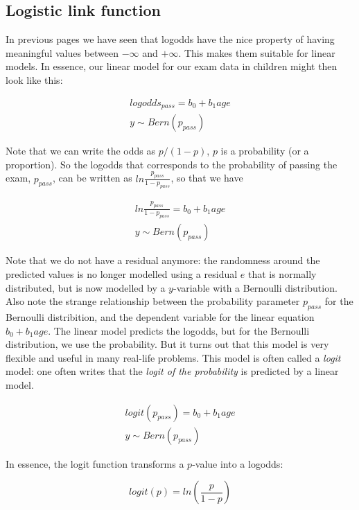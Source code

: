 \documentclass[]{book}\usepackage[]{graphicx}\usepackage[]{color}
\begin{document}
\subsection{Logistic link function}

In previous pages we have seen that logodds have the nice property of having meaningful values between $-\infty$ and $+\infty$. This makes them suitable for linear models. In essence, our linear model for our exam data in children might then look like this:


\begin{eqnarray}
logodds_{pass}= b_0 + b_1 age\\
y \sim Bern(p_{pass})
\end{eqnarray}

Note that we can write the odds as $p/(1-p)$, $p$ is a probability (or a proportion). So the logodds that corresponds to the probability of passing the exam, $p_{pass}$, can be written as $ln\frac{p_{pass}}{1- p_{pass}}$, so that we have


\begin{eqnarray}
ln\frac{p_{pass}}{1- p_{pass}}= b_0 + b_1 age \\
y \sim Bern(p_{pass})
\end{eqnarray}

Note that we do not have a residual anymore: the randomness around the predicted values is no longer modelled using a residual $e$ that is normally distributed, but is now modelled by a $y$-variable with a Bernoulli distribution.
Also note the strange relationship between the probability parameter $p_{pass}$ for the Bernoulli distribition, and the dependent variable for the linear equation $b_0+b_1 age$. The linear model predicts the logodds, but for the Bernoulli distribution, we use the probability. But it turns out that this model is very flexible and useful in many real-life problems. This model is often called a \textit{logit} model: one often writes that the \textit{logit of the probability} is predicted by a linear model.

\begin{eqnarray}
logit(p_{pass}) = b_0 + b_1 age \\
y \sim Bern(p_{pass})
\end{eqnarray}

In essence, the logit function transforms a $p$-value into a logodds:

\begin{equation}
logit(p)= ln( \frac{p}{1-p} ) \nonumber
\end{equation}
\end{document}
